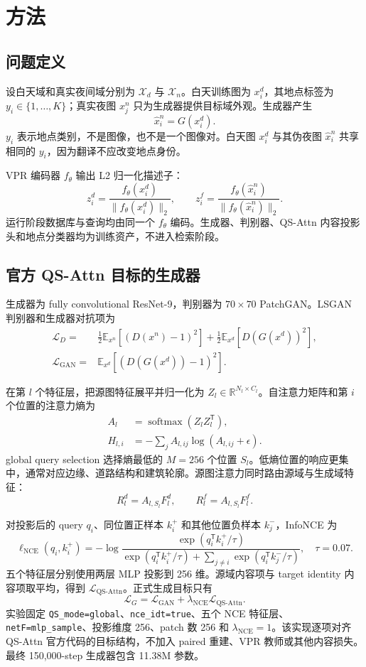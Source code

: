 \documentclass[UTF8,a4paper,11pt]{ctexart}
\begin{document}
\section{方法}
\subsection{问题定义}
设白天域和真实夜间域分别为 $\mathcal X_d$ 与 $\mathcal X_n$。白天训练图为 $x_i^d$，其地点标签为 $y_i\in\{1,\ldots,K\}$；真实夜图 $x_j^n$ 只为生成器提供目标域外观。生成器产生
\[
 \hat x_i^n=G(x_i^d).
\]
$y_i$ 表示地点类别，不是图像，也不是一个图像对。白天图 $x_i^d$ 与其伪夜图 $\hat x_i^n$ 共享相同的 $y_i$，因为翻译不应改变地点身份。

VPR 编码器 $f_\theta$ 输出 L2 归一化描述子：
\[
 z_i^d=\frac{f_\theta(x_i^d)}{\lVert f_\theta(x_i^d)\rVert_2},\qquad
 z_i^f=\frac{f_\theta(\hat x_i^n)}{\lVert f_\theta(\hat x_i^n)\rVert_2}.
\]
运行阶段数据库与查询均由同一个 $f_\theta$ 编码。生成器、判别器、QS-Attn 内容投影头和地点分类器均为训练资产，不进入检索阶段。

\subsection{官方 QS-Attn 目标的生成器}
生成器为 fully convolutional ResNet-9，判别器为 $70\times70$ PatchGAN。LSGAN\cite{lsgan} 判别器和生成器对抗项为
\begin{align}
 \mathcal L_D={}&\frac12\mathbb E_{x^n}\left[(D(x^n)-1)^2\right]
 +\frac12\mathbb E_{x^d}\left[D(G(x^d))^2\right],\\
 \mathcal L_{\mathrm{GAN}}={}&\mathbb E_{x^d}\left[(D(G(x^d))-1)^2\right].
\end{align}

在第 $l$ 个特征层，把源图特征展平并归一化为 $Z_l\in\mathbb R^{N_l\times C_l}$。自注意力矩阵和第 $i$ 个位置的注意力熵为
\begin{align}
 A_l&=\operatorname{softmax}(Z_lZ_l^{\mathsf T}),\\
 H_{l,i}&=-\sum_j A_{l,ij}\log(A_{l,ij}+\epsilon).
\end{align}
global query selection 选择熵最低的 $M=256$ 个位置 $S_l$。低熵位置的响应更集中，通常对应边缘、道路结构和建筑轮廓。源图注意力同时路由源域与生成域特征：
\[
 R_l^d=A_{l,S_l}F_l^d,\qquad R_l^f=A_{l,S_l}F_l^f.
\]

对投影后的 query $q_i$、同位置正样本 $k_i^+$ 和其他位置负样本 $k_j^-$，InfoNCE 为
\[
 \ell_{\mathrm{NCE}}(q_i,k_i^+)=-\log
 \frac{\exp(q_i^{\mathsf T}k_i^+/\tau)}
 {\exp(q_i^{\mathsf T}k_i^+/\tau)+\sum_{j\ne i}\exp(q_i^{\mathsf T}k_j^-/\tau)},
 \quad \tau=0.07.
\]
五个特征层分别使用两层 MLP 投影到 256 维。源域内容项与 target identity 内容项取平均，得到 $\mathcal L_{\mathrm{QS\mbox{-}Attn}}$。正式生成目标只有
\[
 \boxed{\mathcal L_G=\mathcal L_{\mathrm{GAN}}+
 \lambda_{\mathrm{NCE}}\mathcal L_{\mathrm{QS\mbox{-}Attn}}.}
\]
实验固定 \texttt{QS\_mode=global}、\texttt{nce\_idt=true}、五个 NCE 特征层、\texttt{netF=mlp\_sample}、投影维度 256、patch 数 256 和 $\lambda_{\mathrm{NCE}}=1$。该实现逐项对齐 QS-Attn 官方代码的目标结构，不加入 paired 重建、VPR 教师或其他内容损失。最终 150,000-step 生成器包含 11.38M 参数。
\end{document}
